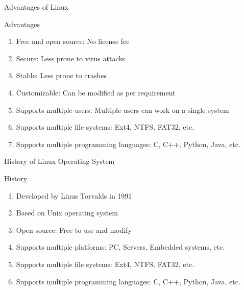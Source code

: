 \documentclass[aspectratio=169]{beamer}
\begin{document}
\begin{frame}{Advantages of Linux}
    \begin{block}{Advantages}
        \begin{enumerate}
            \item Free and open source: No license fee
            \item Secure: Less prone to virus attacks
            \item Stable: Less prone to crashes
            \item Customizable: Can be modified as per requirement
            \item Supports multiple users: Multiple users can work on a single system
            \item Supports multiple file systems: Ext4, NTFS, FAT32, etc.
            \item Supports multiple programming languages: C, C++, Python, Java, etc.
        \end{enumerate}
    \end{block}

\end{frame}

\begin{frame}{History of Linux Operating System}
    \begin{block}{History}
        \begin{enumerate}
            \item Developed by Linus Torvalds in 1991
            \item Based on Unix operating system
            \item Open source: Free to use and modify
            \item Supports multiple platforms: PC, Servers, Embedded systems, etc.
            \item Supports multiple file systems: Ext4, NTFS, FAT32, etc.
            \item Supports multiple programming languages: C, C++, Python, Java, etc.
        \end{enumerate}
    \end{block}
\end{frame}
\end{document}
